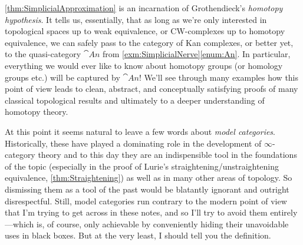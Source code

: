 \cref{thm:SimplicialApproximation} is an incarnation of Grothendieck's \emph{homotopy hypothesis}. It tells us, essentially, that as long as we're only interested in topological spaces up to weak equivalence, or CW-complexes up to homotopy equivalence, we can safely pass to the category of Kan complexes, or better yet, to the quasi-category $\cat{An}$ from \cref{exm:SimplicialNerve}\cref{enum:An}. In particular, everything we would ever like to know about homotopy groups (or homology groups etc.) will be captured by $\cat{An}$! We'll see through many examples how this point of view leads to clean, abstract, and conceptually satisfying proofs of many classical topological results and ultimately to a deeper understanding of homotopy theory.

At this point it seems natural to leave a few words about \emph{model categories}. Historically, these have played a dominating role in the development of $\infty$-category theory and to this day they are an indispensible tool in the foundations of the topic (especially in the proof of Lurie's straightening/unstraightening equivalence, \cref{thm:Straightening}) as well as in many other areas of topology. So dismissing them as a tool of the past would be blatantly ignorant and outright disrespectful. Still, model categories run contrary to the modern point of view that I'm trying to get across in these notes, and so I'll try to avoid them entirely---which is, of course, only achievable by conveniently hiding their unavoidable uses in black boxes. But at the very least, I should tell you the definition.	
